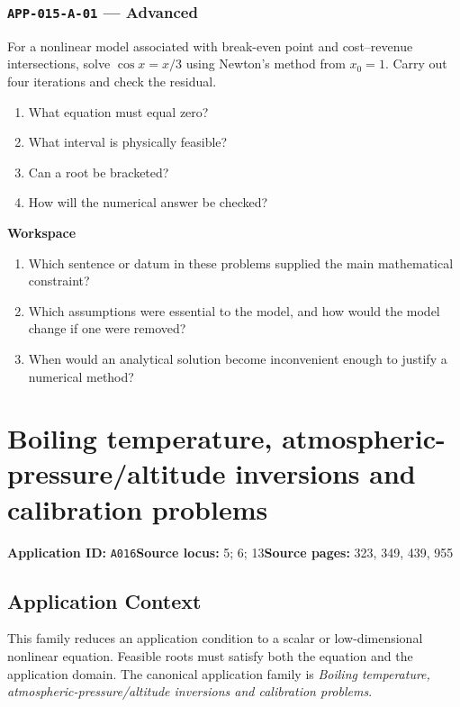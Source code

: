 \documentclass[11pt]{book}
\newcommand{\pid}[1]{\texttt{#1}}
\newcommand{\workspace}{\par\vspace{0.7in}\hrulefill\par\vspace{0.55in}\hrulefill\par}
\begin{document}
\subsection*{\pid{APP-015-A-01} — Advanced}
\begin{problembox}
For a nonlinear model associated with break-even point and cost–revenue intersections, solve $\cos x=x/3$ using Newton's method from $x_0=1$. Carry out four iterations and check the residual.
\end{problembox}
\begin{promptbox}\begin{enumerate}
\item What equation must equal zero?
\item What interval is physically feasible?
\item Can a root be bracketed?
\item How will the numerical answer be checked?
\end{enumerate}\end{promptbox}
\textbf{Workspace}\workspace
\begin{reflectionbox}\begin{enumerate}
\item Which sentence or datum in these problems supplied the main mathematical constraint?
\item Which assumptions were essential to the model, and how would the model change if one were removed?
\item When would an analytical solution become inconvenient enough to justify a numerical method?
\end{enumerate}\end{reflectionbox}
\chapter{Boiling temperature, atmospheric-pressure/altitude inversions and calibration problems}\label{app:A016}
\textbf{Application ID:} \pid{A016}\quad \textbf{Source locus:} 5; 6; 13\quad \textbf{Source pages:} 323, 349, 439, 955
\section*{Application Context}
This family reduces an application condition to a scalar or low-dimensional nonlinear equation. Feasible roots must satisfy both the equation and the application domain. The canonical application family is \emph{Boiling temperature, atmospheric-pressure/altitude inversions and calibration problems}.
\end{document}
